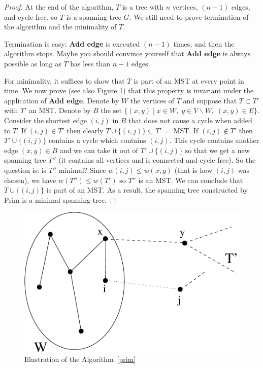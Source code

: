 \begin{proof}
At the end of the algorithm, $T$ is a tree with $n$ vertices,
$(n-1)$ edges, and cycle free, so $T$ is a spanning tree $G$. We still need to prove termination of the algorithm and the minimality of $T$.

Termination is easy: \textbf{Add edge} is executed $(n-1)$ times, and
then the algorithm stops. Maybe you should convince yourself that
\textbf{Add edge} is always possible as long as $T$ has less than
$n-1$ edges.

For minimality, it suffices to show that $T$ is part of an MST at every point in time. 
{
We now prove (see also Figure \ref{prim2}) that this property
is invariant under the application of \textbf{Add edge}. Denote by $W$ the vertices of $T$ and suppose that $T \subset T'$ with
$T'$ an MST. Denote by $B$ the set
%
$\{(x,y)\;|\; x \in W,\; y \in V \backslash W,\; (x,y) \in E\}$.
%
Consider the shortest edge $(i,j)$ in $B$ that does not cause a cycle
when added to $T$. If $(i,j) \in T'$ then clearly $T \cup \{(i,j)\}
\subseteq T' = $ MST. If $(i,j) \notin T'$ then $T' \cup \{(i,j)\}$
contains a cycle which contains $(i,j)$.  This cycle contains another
edge $(x,y) \in B$ and we can take it out of $T' \cup \{(i,j)\}$ so
that we get a new spanning tree $T''$ (it contains all vertices and is
connected and cycle free). So the question is: is $T''$ minimal?
Since $w(i,j) \leq w(x,y)$ (that is how $(i,j)$ was chosen), we
have $w(T'') \leq w(T')$ so $T''$ is an MST. We can conclude that
$T \cup \{(i,j)\}$ is part of an MST.\vspace{2em}
}
As a result, the spanning tree constructed by Prim is a minimal
spanning tree.
\end{proof}

\begin{figure}[ht]
	\centering
	\includegraphics[width=0.4\linewidth,keepaspectratio]{prim2}
	\caption{Illustration of the Algorithm~\ref{prim} \label{prim2}}
\end{figure}

